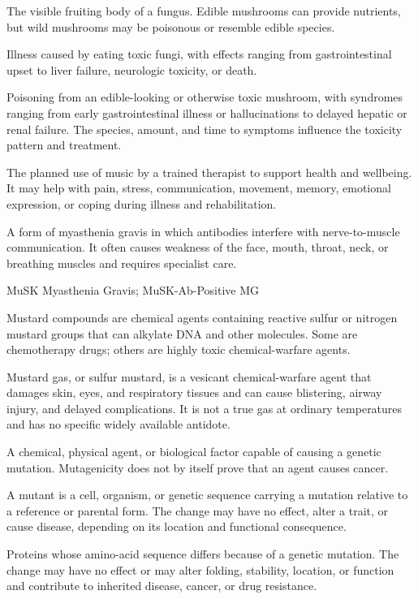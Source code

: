  The visible fruiting body of a fungus. Edible mushrooms can provide nutrients, but wild mushrooms may be poisonous or resemble edible species.

 Illness caused by eating toxic fungi, with effects ranging from gastrointestinal upset to liver failure, neurologic toxicity, or death.

 Poisoning from an edible-looking or otherwise toxic mushroom, with syndromes ranging from early gastrointestinal illness or hallucinations to delayed hepatic or renal failure. The species, amount, and time to symptoms influence the toxicity pattern and treatment.

 The planned use of music by a trained therapist to support health and wellbeing. It may help with pain, stress, communication, movement, memory, emotional expression, or coping during illness and rehabilitation.

 A form of myasthenia gravis in which antibodies interfere with nerve-to-muscle communication. It often causes weakness of the face, mouth, throat, neck, or breathing muscles and requires specialist care.

\synonyms
MuSK Myasthenia Gravis; MuSK-Ab-Positive MG

 Mustard compounds are chemical agents containing reactive sulfur or nitrogen mustard groups that can alkylate DNA and other molecules. Some are chemotherapy drugs; others are highly toxic chemical-warfare agents.

 Mustard gas, or sulfur mustard, is a vesicant chemical-warfare agent that damages skin, eyes, and respiratory tissues and can cause blistering, airway injury, and delayed complications. It is not a true gas at ordinary temperatures and has no specific widely available antidote.

 A chemical, physical agent, or biological factor capable of causing a genetic mutation. Mutagenicity does not by itself prove that an agent causes cancer.

 A mutant is a cell, organism, or genetic sequence carrying a mutation relative to a reference or parental form. The change may have no effect, alter a trait, or cause disease, depending on its location and functional consequence.

 Proteins whose amino-acid sequence differs because of a genetic mutation. The change may have no effect or may alter folding, stability, location, or function and contribute to inherited disease, cancer, or drug resistance.

